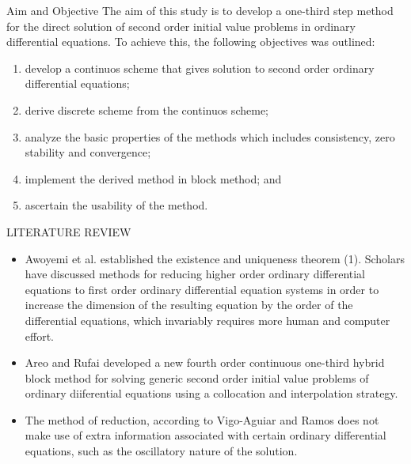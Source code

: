 \documentclass[compress, 19pt, blue]{beamer}
\begin{document}
\begin{frame}{Aim and Objective}
\noindent The aim of this study is to develop a one-third step method for the direct solution of second order initial value problems in ordinary differential equations. To achieve this, the following objectives was outlined:
\begin{enumerate}
	\item develop a continuos scheme that gives solution to second order ordinary differential equations;
	\item  derive discrete scheme from the continuos scheme;
	\item analyze the basic properties of the methods which includes consistency, zero stability and convergence;
	\item  implement the derived method in block method; and
	\item  ascertain the usability of the method.
\end{enumerate}
\end{frame}
	
\begin{frame}{LITERATURE REVIEW}
	\color{blue}
\begin{itemize}
	\item Awoyemi et al.\cite{Awoyemi} established the existence and uniqueness theorem (1). Scholars have discussed methods for reducing higher order ordinary differential equations to first order ordinary differential equation systems in order to increase the dimension of the resulting equation by the order of the differential equations, which invariably requires more human and computer effort. 
	\item  Areo and Rufai \cite{Areo} developed a new fourth order continuous one-third hybrid block method for solving generic second order initial value problems of ordinary diiferential equations using a collocation and interpolation strategy.
	\item The method of reduction, according to Vigo-Aguiar and Ramos \cite{Vigo-Aguiar} does not make use of extra information associated with certain ordinary differential equations, such as the oscillatory nature of the solution.
\end{itemize}
\end{frame}
\end{document}

